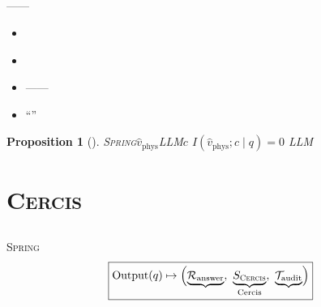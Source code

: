 \documentclass[12pt,a4paper]{article}
\newtheorem{proposition}[theorem]{Proposition}
\theoremstyle{remark}
\newcommand{\Spring}{\textsc{Spring}}
\newcommand{\Cercis}{\textsc{Cercis}}
\begin{document}
\subsection{}


\textbf{}——



\begin{itemize}[itemsep=2pt]
    \item 
    \item \textit{}
    \item ——
    \item 
    “”
\end{itemize}

\begin{proposition}[]\label{prop:independence}
\Spring{}$\hat{v}_{\text{phys}}$LLM$c$
$I(\hat{v}_{\text{phys}}; c \mid q) = 0$
LLM
\end{proposition}

\newpage

\section{\Cercis{}}

\subsection{}

\Spring{}
\begin{equation}\label{eq:output_triplet}
    \boxed{\text{Output}(q) \mapsto \Bigl(
        \underbrace{\mathcal{R}_{\text{answer}}}_{\text{}},\ 
        \underbrace{S_{\Cercis}}_{\text{Cercis}},\ 
        \underbrace{\mathcal{T}_{\text{audit}}}_{\text{}}
    \Bigr)}
\end{equation}
\end{document}
